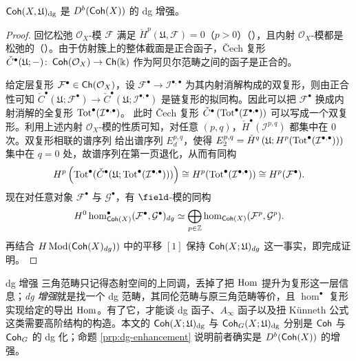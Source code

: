 \begin{prp}\label{prp:dg-enhancement}
$\operatorname{\mathsf{Coh}}(X,\mathfrak{U})_{\operatorname{\operatorname{dg}}}$ 是 $D^b(\operatorname{\mathsf{Coh}}(X))$ 的 dg 增强。
\end{prp}
\begin{proof}
    回忆松弛 $\mathcal{O}_X$-模 $\mathcal{F}$ 满足 $\check{H}^p (\mathfrak{U},\mathcal{F})=0$（$p>0$）（\cite[Chapter 3, Proposition 4.3]{Hartshorne77}），且内射 $\mathcal{O}_X$-模都是松弛的（\cite[Chapter 3, Lemma 2.4]{Hartshorne77}）。由于仿射簇上的整体截面是正合函子，Čech 复形 $\check{C}^{\bullet} (\mathfrak{U};-)\colon\operatorname{\mathsf{Coh}} (\mathcal{O}_X)\to\operatorname{\mathsf{Ch}} (\Bbbk)$ 作为阿贝尔范畴之间的函子是正合的。\par
    给定层复形 $\mathcal{F}^{\bullet}\in\operatorname{\mathsf{Ch}} (\mathcal{O}_X)$，设 $\mathcal{F}^{\bullet}\to\mathcal{I}^{\bullet,\bullet}$ 为其内射消解构成的双复形，则由正合性可知 $\check{C}^{\bullet} (\mathfrak{U};\mathcal{F}^{\bullet})\to\check{C}^{\bullet} (\mathfrak{U};\mathcal{I}^{\bullet,\bullet})$ 是链复形的拟同构。因此可以把 $\mathcal{F}^{\bullet}$ 换成内射消解的全复形 $\operatorname{Tot}^{\bullet} (\mathcal{I}^{\bullet,\bullet})$。
    此时 Čech 复形 $\check{C}^{\bullet}\left(\operatorname{Tot}^{\bullet} (\mathcal{I}^{\bullet,\bullet})\right)$ 可以写成一个双复形。利用上述内射 $\mathcal{O}_X$-模的性质可知，对任意 $(p,q)$，$\displaystyle\check{H}^{\bullet} (\mathcal{I}^{p,q})$ 都集中在 $0$ 次。双复形相联的谱序列 \cite[\href{https://stacks.math.columbia.edu/tag/012X}{Section 012X}]{stacks-project} 给出谱序列 $E^{p,q}_d$，使得 $E_2^{p,q}=\displaystyle\check{H}^q\left(\mathfrak{U};H^p(\operatorname{Tot}^{\bullet}(\mathcal{I}^{\bullet,\bullet}))\right)$ 集中在 $q=0$ 处，故谱序列在第一页退化，从而有同构\[
    H^p\left(\operatorname{Tot}^{\bullet}(\check{C}^{\bullet} (\mathfrak{U};\operatorname{Tot}^{\bullet} (\mathcal{I}^{\bullet,\bullet})))\right)\cong H^p (\operatorname{Tot}^{\bullet} (\mathcal{I}^{\bullet,\bullet}))\cong H^p (\mathcal{F}^{\bullet}).
    \]
    现在对任意对象 $\mathcal{F}^{\bullet}$ 与 $\mathcal{G}^{\bullet}$，有 $\field$-模的同构\[
    H^0\hom^{\bullet}_{\operatorname{\mathsf{Coh}} (X)} (\mathcal{F}^{\bullet},\mathcal{G}^{\bullet})_{dg}\simeq\bigoplus_{p\in\mathbb{Z}}\hom_{\operatorname{\mathsf{Coh}} (X)} (\mathcal{F}^p,\mathcal{G}^p).
    \]再结合 $H\operatorname{\mathrm{Mod}} (\operatorname{\mathsf{Coh}}(X)_{dg}))$ 中的平移 $[1]$ 保持 $\operatorname{\mathsf{Coh}} (X;\mathfrak{U})_{dg}$ 这一事实，即完成证明。
\end{proof}

\begin{conceptbox}{dg 增强}
三角范畴只记得态射空间的上同调，丢掉了把 $\operatorname{\operatorname{Hom}}$ 提升为复形这一层信息；\emph{dg 增强}就是找一个 dg 范畴，其同伦范畴与原三角范畴等价，且 $\hom^{\bullet}$ 复形实现给定的导出 $\operatorname{\operatorname{Hom}}$。有了它，才能谈 dg 函子、$A_\infty$ 函子以及扭 Künneth 公式这类需要高阶结构的构造。本文的 $\operatorname{\mathsf{Coh}}(X;\mathfrak{U})_{\operatorname{\operatorname{dg}}}$ 与 $\operatorname{\mathsf{Coh}}_G(X;\mathfrak{U})_{\operatorname{\operatorname{dg}}}$ 分别是 $\operatorname{\mathsf{Coh}}$ 与 $\operatorname{\mathsf{Coh}}_G$ 的 dg 化；命题 \ref{prp:dg-enhancement} 说明前者确实是 $D^b(\operatorname{\mathsf{Coh}}(X))$ 的增强。
\par\smallskip{}
\end{conceptbox}

